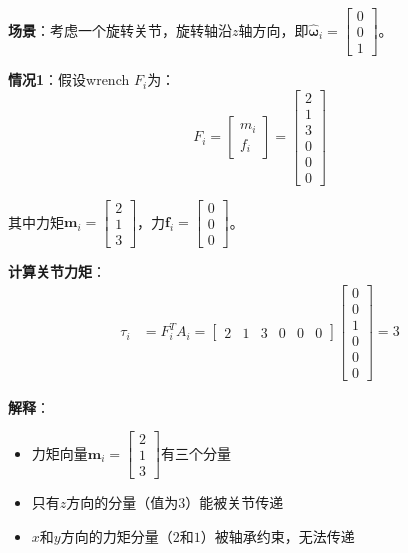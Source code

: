 \documentclass[12pt,a4paper]{article}
\begin{document}
\textbf{场景}：考虑一个旋转关节，旋转轴沿$z$轴方向，即$\hat{\bm{\omega}}_i = \begin{bmatrix} 0 \\ 0 \\ 1 \end{bmatrix}$。

\textbf{情况1}：假设wrench $F_i$为：
\begin{equation}
F_i = \begin{bmatrix} m_i \\ f_i \end{bmatrix} = \begin{bmatrix} 2 \\ 1 \\ 3 \\ 0 \\ 0 \\ 0 \end{bmatrix}
\end{equation}

其中力矩$\bm{m}_i = \begin{bmatrix} 2 \\ 1 \\ 3 \end{bmatrix}$，力$\bm{f}_i = \begin{bmatrix} 0 \\ 0 \\ 0 \end{bmatrix}$。

\textbf{计算关节力矩}：
\begin{align}
\tau_i &= F_i^T A_i = \begin{bmatrix} 2 & 1 & 3 & 0 & 0 & 0 \end{bmatrix} \begin{bmatrix} 0 \\ 0 \\ 1 \\ 0 \\ 0 \\ 0 \end{bmatrix} = 3
\end{align}

\textbf{解释}：
\begin{itemize}
\item 力矩向量$\bm{m}_i = \begin{bmatrix} 2 \\ 1 \\ 3 \end{bmatrix}$有三个分量
\item 只有$z$方向的分量（值为$3$）能被关节传递
\item $x$和$y$方向的力矩分量（$2$和$1$）被轴承约束，无法传递
\end{itemize}
\end{document}
